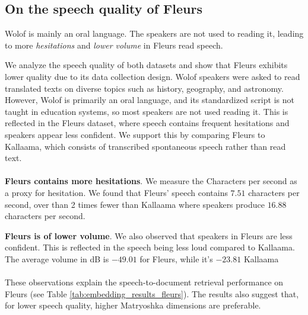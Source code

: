 \documentclass[11pt]{article}
\newcommand{\myparagraph}[1]{\noindent\textbf{#1}}
\begin{document}
\subsection{On the speech quality of Fleurs}
\begin{tcolorbox}[compactbox,colback=violet!15!white,colframe=violet!100!white,title={\color{black} \textbf{Finding 4}: Wolof speech in Fleurs is unnatural.}]
Wolof is mainly an oral language. The speakers are not used to reading it, leading to more \textit{hesitations} and \textit{lower volume} in Fleurs read speech.
\end{tcolorbox}
We analyze the speech quality of both datasets and show that Fleurs exhibits lower quality due to its data collection design. Wolof speakers were asked to read translated texts on diverse topics such as history, geography, and astronomy. However, Wolof is primarily an oral language, and its standardized script is not taught in education systems, so most speakers are not used reading it. This is reflected in the Fleurs dataset, where speech contains frequent hesitations and speakers appear less confident. We support this by comparing Fleurs to Kallaama, which consists of transcribed spontaneous speech rather than read text.
\\
\\
\myparagraph{Fleurs contains more hesitations}. We measure the Characters per second as a proxy for hesitation. We found that Fleurs' speech contains $7.51$ characters per second, over than 2 times fewer than Kallaama where speakers produce $16.88$ characters per second.

\myparagraph{Fleurs is of lower volume}. We also observed that speakers in Fleurs are less confident. This is reflected in the speech being less loud compared to Kallaama. The average volume in dB is $-49.01$ for Fleurs, while it's $-23.81$ Kallaama
\\
\\
These observations explain the speech-to-document retrieval performance on Fleurs (see Table \ref{tab:embedding_results_fleurs}). The results also suggest that, for lower speech quality, higher Matryoshka dimensions are preferable.
\end{document}
